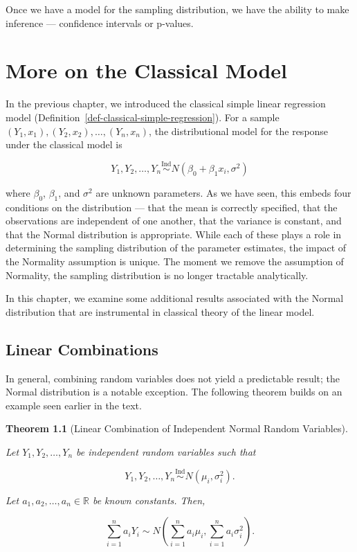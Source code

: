 \documentclass[
  letterpaper,
  DIV=11,
  numbers=noendperiod]{scrreprt}
\theoremstyle{definition}
\theoremstyle{definition}
\theoremstyle{plain}
\newtheorem{theorem}{Theorem}[chapter]
\theoremstyle{remark}
\begin{document}
Once we have a model for the sampling distribution, we have the ability
to make inference --- confidence intervals or p-values.


\hypertarget{sec-normality}{%
\chapter{More on the Classical Model}\label{sec-normality}}

In the previous chapter, we introduced the classical simple linear
regression model (Definition~\ref{def-classical-simple-regression}). For
a sample
\(\left(Y_1, x_1\right), \left(Y_2, x_2\right), \dotsc, \left(Y_n, x_n\right)\),
the distributional model for the response under the classical model is

\[Y_1, Y_2, \dotsc, Y_n \stackrel{\text{Ind}}{\sim} N\left(\beta_0 + \beta_1 x_i, \sigma^2\right)\]

where \(\beta_0\), \(\beta_1\), and \(\sigma^2\) are unknown parameters.
As we have seen, this embeds four conditions on the distribution ---
that the mean is correctly specified, that the observations are
independent of one another, that the variance is constant, and that the
Normal distribution is appropriate. While each of these plays a role in
determining the sampling distribution of the parameter estimates, the
impact of the Normality assumption is unique. The moment we remove the
assumption of Normality, the sampling distribution is no longer
tractable analytically.

In this chapter, we examine some additional results associated with the
Normal distribution that are instrumental in classical theory of the
linear model.

\hypertarget{linear-combinations}{%
\section{Linear Combinations}\label{linear-combinations}}

In general, combining random variables does not yield a predictable
result; the Normal distribution is a notable exception. The following
theorem builds on an example seen earlier in the text.

\begin{theorem}[Linear Combination of Independent Normal Random
Variables]\protect\hypertarget{thm-normal-linear-combination}{}\label{thm-normal-linear-combination}

Let \(Y_1, Y_2, \dotsc, Y_n\) be independent random variables such that

\[Y_1, Y_2, \dotsc, Y_n \stackrel{\text{Ind}}{\sim} N\left(\mu_i, \sigma^2_i\right).\]

Let \(a_1, a_2, \dotsc, a_n \in \mathbb{R}\) be known constants. Then,

\[\sum_{i=1}^{n} a_i Y_i \sim N\left(\sum_{i=1}^{n} a_i \mu_i, \sum_{i=1}^{n} a_i \sigma^2_i\right).\]

\end{theorem}
\end{document}
